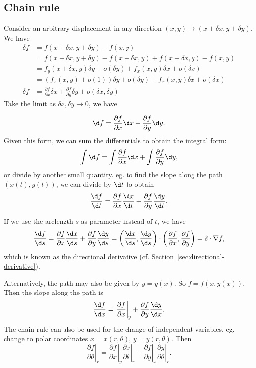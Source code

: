 \documentclass[a4paper]{article}
\begin{document}
  \subsection{Chain rule}
  Consider an arbitrary displacement in any direction $(x, y) \to (x+\delta x, y + \delta y)$. We have
  \begin{align*}
    \delta f &= f(x+\delta x, y + \delta y) - f(x, y)\\
    &= f(x+\delta x, y + \delta y) - f(x + \delta x, y) + f(x+\delta x, y) - f(x, y)\\
    &= f_y(x + \delta x, y)\delta y + o(\delta y) + f_x(x, y)\delta x + o(\delta x)\\
    &= (f_x(x, y) + o(1))\delta y + o(\delta y) + f_x(x, y)\delta x + o(\delta x)\\
    \delta f&= \frac{\partial f}{\partial x}\delta x + \frac{\partial f}{\partial y}\delta y + o(\delta x, \delta y)
  \end{align*}
  Take the limit as $\delta x, \delta y \to 0$, we have 
  \begin{thm}
    \[
      \d f = \frac{\partial f}{\partial x}\d x + \frac{\partial f}{\partial y}\d y.
    \]
    Given this form, we can sum the differentials to obtain the integral form:
    \[
      \int \d f = \int \frac{\partial f}{\partial x}\d x + \int \frac{\partial f}{\partial y}\d y,
    \]
    or divide by another small quantity. eg. to find the slope along the path $(x(t), y(t))$, we can divide by $\d t$ to obtain
    \[
      \frac{\d f}{\d t} = \frac{\partial f}{\partial x}\frac{\d x}{\d t} + \frac{\partial f}{\partial y}\frac{\d y}{\d t}.
    \]
  \end{thm}

  If we use the arclength $s$ as parameter instead of $t$, we have 
  \[
    \frac{\d f}{\d s} = \frac{\partial f}{\partial x}\frac{\d x}{\d s} + \frac{\partial f}{\partial y}\frac{\d y}{\d s} = \left(\frac{\d x}{\d s}, \frac{\d y}{\d s}\right)\cdot \left(\frac{\partial f}{\partial x}, \frac{\partial f}{\partial y}\right) = \hat{s}\cdot \nabla f,
  \]
  which is known as the directional derivative (cf. Section~\ref{sec:directional-derivative}).

  Alternatively, the path may also be given by $y = y(x)$. So $f = f(x, y(x))$. Then the slope along the path is
  \[
    \frac{\d f}{\d x} = \left.\frac{\partial f}{\partial x}\right|_y + \frac{\partial f}{\partial y}{\frac{\d y}{\d x}}.
  \]
  The chain rule can also be used for the change of independent variables, eg. change to polar coordinates $x = x(r, \theta)$, $y = y(r, \theta)$. Then 
  \[
    \left.\frac{\partial f}{\partial \theta}\right|_r = \left. \frac{\partial f}{\partial x}\right|_y \left.\frac{\partial x}{\partial \theta}\right|_r + \left.\frac{\partial f}{\partial y}\right|_x\left.\frac{\partial y}{\partial \theta}\right|_r.
  \]
\end{document}
